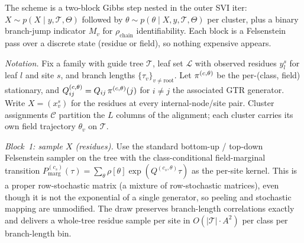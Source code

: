 The scheme is a two-block Gibbs step nested in the outer SVI iter:
$X \sim p(X \mid y, \mathcal{T}, \Theta)$ followed by
$\theta \sim p(\theta \mid X, y, \mathcal{T}, \Theta)$ per cluster, plus a
binary branch-jump indicator $M_v$ for $\rho_{\text{chain}}$
identifiability. Each block is a Felsenstein pass over a discrete
state (residue or field), so nothing expensive appears.

\emph{Notation.} Fix a family with guide tree $\mathcal{T}$, leaf set
$\mathcal{L}$ with observed residues $y_l^s$ for leaf $l$ and site $s$,
and branch lengths $\{\tau_v\}_{v \ne \text{root}}$. Let
$\pi^{(c, \theta)}$ be the per-(class, field) stationary, and $Q^{(c,
\theta)}_{ij} = Q_{ij}\,\pi^{(c, \theta)}(j)$ for $i \ne j$ the
associated GTR generator. Write $X = (x_v^s)$ for the residues at every
internal-node/site pair. Cluster assignments $\mathcal{C}$ partition
the $L$ columns of the alignment; each cluster carries its own field
trajectory $\theta_v$ on $\mathcal{T}$.

\emph{Block~1: sample $X$ (residues).} Use the standard bottom-up /
top-down Felsenstein sampler on the tree with the class-conditional
field-marginal transition $P^{(c_s)}_{\mathrm{marg}}(\tau) =
\sum_\theta \rho[\theta] \exp(Q^{(c_s, \theta)} \tau)$ as the per-site
kernel. This is a proper row-stochastic matrix (a mixture of
row-stochastic matrices), even though it is not the exponential of a
single generator, so peeling and stochastic mapping are unmodified.
The draw preserves branch-length correlations exactly and delivers a
whole-tree residue sample per site in $O(|\mathcal{T}| \cdot A^2)$ per
class per branch-length bin.

